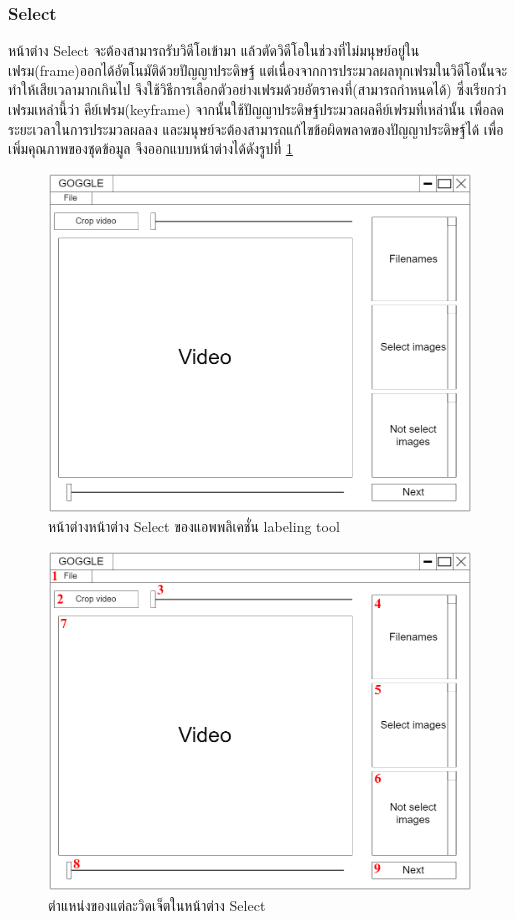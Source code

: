 \subsubsection{Select}
หน้าต่าง Select จะต้องสามารถรับวิดีโอเข้ามา แล้วตัดวิดีโอในช่วงที่ไม่มนุษย์อยู่ในเฟรม(frame)ออกได้อัตโนมัติด้วยปัญญาประดิษฐ์
แต่เนื่องจากการประมวลผลทุกเฟรมในวิดีโอนั้นจะทำให้เสียเวลามากเกินไป จึงใช้วิธีการเลือกตัวอย่างเฟรมด้วยอัตราคงที่(สามารถกำหนดได้)
ซึ่งเรียกว่าเฟรมเหล่านี้ว่า คีย์เฟรม(keyframe) จากนั้นใช้ปัญญาประดิษฐ์ประมวลผลคีย์เฟรมที่เหล่านั้น 
เพื่อลดระยะเวลาในการประมวลผลลง และมนุษย์จะต้องสามารถแก้ไขข้อผิดพลาดของปัญญาประดิษฐ์ได้ 
เพื่อเพิ่มคุณภาพของชุดข้อมูล จึงออกแบบหน้าต่างได้ดังรูปที่ \ref{fig:SelectDraft}

\begin{figure}[!ht]
    \centering
    \includegraphics[width=1\textwidth]{chapter3/images/3_6/SelectDraft.png}
    \caption{หน้าต่างหน้าต่าง Select ของแอพพลิเคชั่น labeling tool}
    \label{fig:SelectDraft}
\end{figure}
\clearpage
\begin{figure}[!ht]
    \centering
    \includegraphics[width=1\textwidth]{chapter3/images/3_6/SelectDraft_point.png}
    \caption{ตำแหน่งของแต่ละวิดเจ็ตในหน้าต่าง Select}
    \label{fig:SelectDraft_point}
\end{figure}
